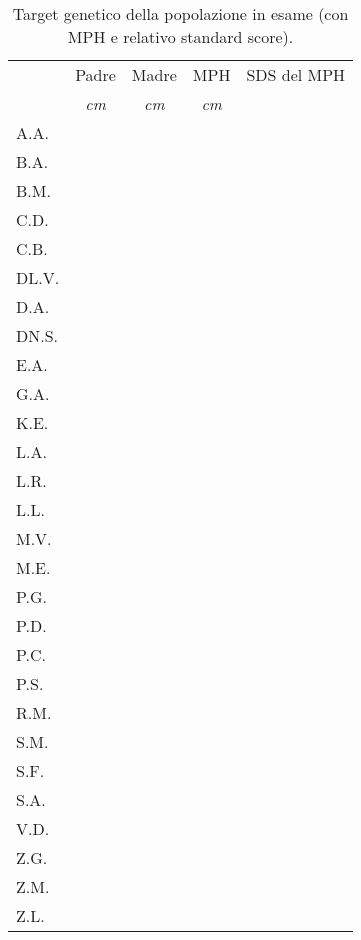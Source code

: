 \begin{table}[!h]
\begin{center}
\addtolength{\tabcolsep}{12pt}
\begin{tabular}{lcccc}
\toprule

 & Padre & Madre & MPH & SDS del MPH \\
 & \emph{cm} & \emph{cm} & \emph{cm} & \\
\midrule
A.A.	&  &  &  &  \\
B.A.	&  &  &  &  \\
B.M.	&  &  &  &  \\
C.D.	&  &  &  &  \\
C.B.	&  &  &  &  \\
DL.V.	&  &  &  &  \\
D.A.	&  &  &  &  \\
DN.S.	&  &  &  &  \\
E.A.	&  &  &  &  \\
G.A.	&  &  &  &  \\
K.E.	&  &  &  &  \\
L.A.	&  &  &  &  \\
L.R.	&  &  &  &  \\
L.L.	&  &  &  &  \\
M.V.	&  &  &  &  \\
M.E.	&  &  &  &  \\
P.G.	&  &  &  &  \\
P.D.	&  &  &  &  \\
P.C.	&  &  &  &  \\
P.S.	&  &  &  &  \\
R.M.	&  &  &  &  \\
S.M.	&  &  &  &  \\
S.F.	&  &  &  &  \\
S.A.	&  &  &  &  \\
V.D.	&  &  &  &  \\
Z.G.	&  &  &  &  \\
Z.M.	&  &  &  &  \\
Z.L.	&  &  &  &  \\
\bottomrule
\end{tabular}
\end{center}
\caption{Target genetico della popolazione in esame (con MPH e relativo standard score).}
\label{tab:TargetGenetici}
\end{table}

